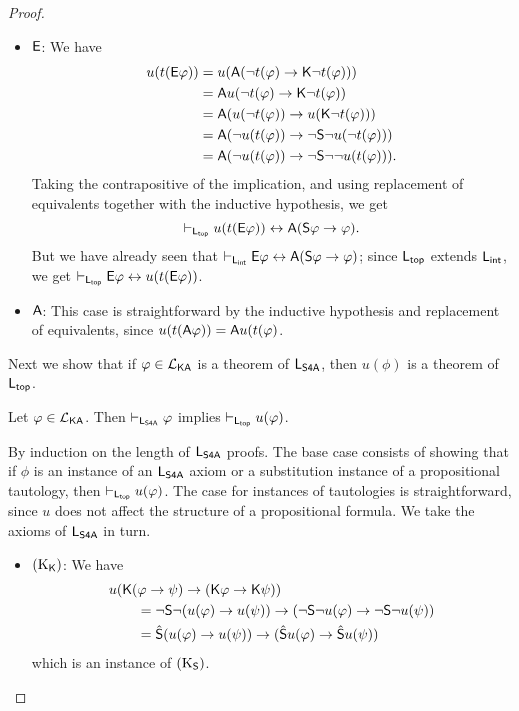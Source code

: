 \begin{proof}
\begin{claimproof}
\begin{itemize}
        \item $\mathsf{E}$: We have
        \[
        \begin{aligned}
   u(t(\mathsf{E}\varphi))
   &= u(\mathsf{A}(\neg t(\varphi) \rightarrow \mathsf{K}\neg t(\varphi))) \\
   &= \mathsf{A} u(\neg t(\varphi) \rightarrow \mathsf{K}\neg t(\varphi)) \\
   &= \mathsf{A} (u(\neg t(\varphi)) \rightarrow u(\mathsf{K}\neg t(\varphi))) \\
   &= \mathsf{A} (\neg u(t(\varphi)) \rightarrow \neg\mathsf{S}\neg u(\neg t(\varphi))) \\
   &= \mathsf{A} (\neg u(t(\varphi)) \rightarrow \neg\mathsf{S}\neg \neg u(t(\varphi))).
\end{aligned}\]
        Taking the contrapositive of the implication, and using
replacement of equivalents together with the inductive hypothesis,
we get
        \[
        \vdash_{\mathsf{L}_{\mathsf{top}}} u(t(\mathsf{E}\varphi))
    \leftrightarrow
    \mathsf{A}(
       \mathsf{S}\varphi \rightarrow \varphi
    ).\]
        But we have already seen that $\vdash_{\mathsf{L}_{\mathsf{int}}} \mathsf{E}\varphi
\leftrightarrow \mathsf{A}(\mathsf{S}\varphi \rightarrow \varphi)$; since $\mathsf{L}_{\mathsf{top}}$ extends
$\mathsf{L}_{\mathsf{int}}$, we get $\vdash_{\mathsf{L}_{\mathsf{top}}} \mathsf{E}\varphi \leftrightarrow
u(t(\mathsf{E}\varphi))$.

        \item $\mathsf{A}$: This case is straightforward by the inductive
hypothesis and replacement of equivalents, since
$u(t(\mathsf{A}\varphi)) = \mathsf{A} u(t(\varphi)$.

        \end{itemize}
\end{claimproof}

Next we show that if $\varphi \in \mathcal{L}_{\mathsf{K}\mathsf{A}}$ is a theorem of
$\mathsf{L}_{\mathsf{S4A}}$, then $u(\phi)$ is a theorem of $\mathsf{L}_{\mathsf{top}}$.

\begin{claim}
\label{exp_claim_u_thm}

Let $\varphi \in \mathcal{L}_{\mathsf{K}\mathsf{A}}$. Then
$\vdash_{\mathsf{L}_{\mathsf{S4A}}} \varphi$ implies $\vdash_{\mathsf{L}_{\mathsf{top}}}
u(\varphi)$.

\end{claim}
    \begin{claimproof}
    By induction on the length of $\mathsf{L}_{\mathsf{S4A}}$ proofs. The base
case consists of showing that if $\phi$ is an instance of an
$\mathsf{L}_{\mathsf{S4A}}$ axiom or a substitution instance of a
propositional tautology, then $\vdash_{\mathsf{L}_{\mathsf{top}}} u(\varphi)$.
The case for instances of tautologies is straightforward, since
$u$ does not affect the structure of a propositional formula.
We take the axioms of $\mathsf{L}_{\mathsf{S4A}}$ in turn.

    \begin{itemize}
    \item $(\text{K}_{\mathsf{K}})$: We have
        \[
        \begin{aligned}
   &u(\mathsf{K}(\varphi \rightarrow \psi) \rightarrow (\mathsf{K}\varphi \rightarrow \mathsf{K}\psi))
    \\
   &\qquad
   = \neg\mathsf{S}\neg (u(\varphi) \rightarrow u(\psi))
        \rightarrow (\neg\mathsf{S}\neg u(\varphi) \rightarrow \neg\mathsf{S}\neg u(\psi))
       \\
   &\qquad
   = \hat{\mathsf{S}} (u(\varphi) \rightarrow u(\psi)) \rightarrow
       (\hat{\mathsf{S}} u(\varphi) \rightarrow \hat{\mathsf{S}} u(\psi))
\end{aligned}\]
        which is an instance of $(\text{K}_{\mathsf{S}})$.


\end{itemize}
\end{claimproof}
\end{proof}
